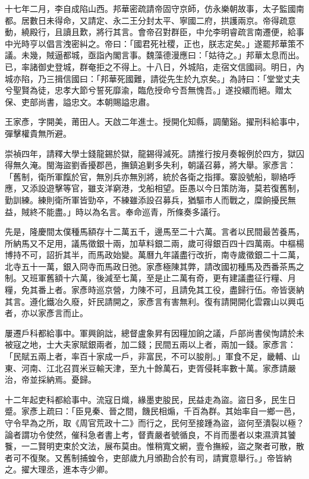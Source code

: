 \begin{pinyinscope}
十七年二月，李自成陷山西。邦華密疏請帝固守京師，仿永樂朝故事，太子監國南都。居數日未得命，又請定、永二王分封太平、寧國二府，拱護兩京。帝得疏意動，繞殿行，且讀且歎，將行其言。會帝召對群臣，中允李明睿疏言南遷便，給事中光時亨以倡言洩密糾之。帝曰：「國君死社稷，正也，朕志定矣。」遂罷邦華策不議。未幾，賊逼都城，亟詣內閣言事。魏藻德漫應曰：「姑待之。」邦華太息而出。已，率諸御史登城，群奄拒之不得上。十八日，外城陷，走宿文信國祠。明日，內城亦陷，乃三揖信國曰：「邦華死國難，請從先生於九京矣。」為詩曰：「堂堂丈夫兮聖賢為徒，忠孝大節兮誓死靡渝，臨危授命兮吾無愧吾。」遂投繯而絕。贈太保、吏部尚書，謚忠文。本朝賜謚忠肅。

王家彥，字開美，莆田人。天啟二年進士。授開化知縣，調蘭谿。擢刑科給事中，彈擊權貴無所避。

崇禎四年，請釋大學士錢龍錫於獄，龍錫得減死。請推行按月奏報例於四方，獄囚得無久淹。閩海盜劉香擾郡邑，撫鎮追剿多失利，朝議召募，將大舉。家彥言：「舊制，衛所軍餼於官，無別兵亦無別將，統於各衛之指揮。寨設號船，聊絡呼應，又添設遊擊等官，雖支洋窮港，戈船相望。臣愚以今日策防海，莫若復舊制，勤訓練。練則衛所軍皆勁卒，不練雖添設召募兵，猶驅市人而戰之，糜餉擾民無益，賊終不能盡。」時以為名言。奉命巡青，所條奏多議行。

先是，隆慶間太僕種馬額存十二萬五千，邊馬至二十六萬。言者以民間最苦養馬，所納馬又不足用，議馬徵銀十兩，加草料銀二兩，歲可得銀百四十四萬兩。中樞楊博持不可，詔折其半，而馬政始變。萬曆九年議盡行改折，南寺歲徵銀二十二萬，北寺五十一萬，銀入冏寺而馬政日弛。家彥極陳其弊，請改國初種馬及西番茶馬之制。又班軍舊額十六萬，後減至七萬，至是止二萬有奇，更有建議盡征行糧、月糧，免其番上者。家彥時巡京營，力陳不可，且請免其工役，盡歸行伍。帝皆褒納其言。遵化鐵冶久廢，奸民請開之，家彥言有害無利。復有請開開化雲霧山以興屯者，亦以家彥言而止。

屢遷戶科都給事中。軍興餉詘，總督盧象昇有因糧加餉之議，戶部尚書侯恂請於未被寇之地，士大夫家賦銀兩者，加二錢；民間五兩以上者，兩加一錢。家彥言：「民賦五兩上者，率百十家成一戶，非富民，不可以朘削。」軍食不足，畿輔、山東、河南、江北召買米豆輸天津，至九十餘萬石，吏胥侵耗率數十萬。家彥請嚴治，帝並採納焉。憂歸。

十二年起吏科都給事中。流寇日熾，緣墨吏朘民，民益走為盜。盜日多，民生日蹙。家彥上疏曰：「臣見秦、晉之間，饑民相煽，千百為群。其始率自一鄉一邑，守令早為之所，取《周官荒政十二》而行之，民何至接踵為盜，盜何至潰裂以極？論者謂功令使然，催科急者書上考，督責嚴者號循良，不肖而墨者以束濕濟其饕餮，一二賢明吏束於文法，展布莫由。惟稍寬文網，壹令撫綏，盜之聚者可散，散者可不復聚。又舊制捕蝗令，吏部歲九月頒勘合於有司，請實意舉行。」帝皆納之。擢大理丞，進本寺少卿。


\end{pinyinscope}
